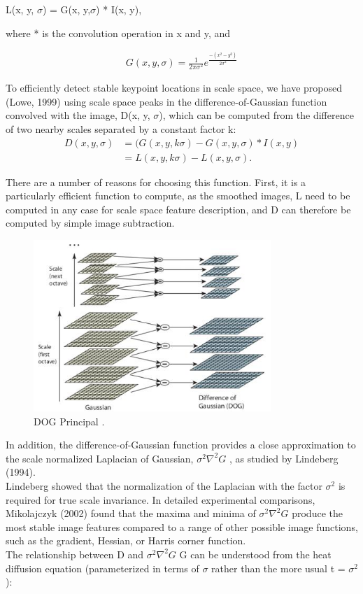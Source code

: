 L(x, y, $\sigma$) = G(x, y,$\sigma$) * I(x, y),


where * is the convolution operation in x and y, and

\begin{align*} 
 G(x, y,\sigma )  =\frac{1}{2\pi\sigma^2} e^\frac{-( x^2 -  y^2)}{2\sigma^2}  
\end{align*}

To efficiently detect stable keypoint locations in scale space, we have proposed (Lowe,
1999) using scale space peaks in the difference-of-Gaussian function convolved with the
image, D(x, y, $\sigma$), which can be computed from the difference of two nearby scales separated
by a constant factor k:
\begin{align}
D(x, y, \sigma) &= (G(x, y, k\sigma) - G(x, y,\sigma) * I(x, y)\\
                 &= L(x, y, k\sigma) - L(x, y, \sigma) .
   \end{align}               
                  
There are a number of reasons for choosing this function. First, it is a particularly
efficient function to compute, as the smoothed images, L  need to be computed in any
case for scale space feature description, and D can therefore be computed by simple image
subtraction.

\begin{figure}[H]
\centering
\includegraphics[width=0.8\textwidth]{img/sift_dog.jpg}
\caption{ DOG Principal .}
\label{fig:sift1}
\end{figure}

In addition, the difference-of-Gaussian function provides a close approximation to the
scale normalized Laplacian of Gaussian, $\sigma^2\nabla^2 G $
, as studied by Lindeberg (1994).\\Lindeberg
showed that the normalization of the Laplacian with the factor $\sigma^2$
is required for true scale invariance. In detailed experimental comparisons, Mikolajczyk (2002) found that the maxima and minima of $\sigma^2\nabla^2 G $  produce the most stable image features compared to a range
of other possible image functions, such as the gradient, Hessian, or Harris corner function.\\
The relationship between D and $\sigma^2\nabla^2G $
G can be understood from the heat diffusion
equation (parameterized in terms of $\sigma$ rather than the more usual t = $\sigma^2$):\\

